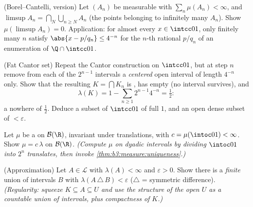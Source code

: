 \begin{exercise}[$\star\star$]\label{exo:b3:measure:4}
(Borel--Cantelli,  version) Let $(A_n)$ be measurable
with $\sum_n\mu(A_n) < \infty$, and $\limsup A_n =
\bigcap_N\bigcup_{n\geq N}A_n$ (the points belonging to
infinitely many $A_n$). Show $\mu(\limsup A_n) = 0$.
Application: for almost every $x \in \intcc01$, only finitely
many $n$ satisfy $\abs{x - p/q_n} \leq 4^{-n}$ for the
$n$-th rational $p/q_n$ of an enumeration of
$\Q\cap\intcc01$.
\end{exercise}

\begin{exercise}[$\star\star$]\label{exo:b3:measure:5}
(Fat Cantor set) Repeat the Cantor construction on $\intcc01$,
but at step $n$ remove from each of the $2^{n-1}$ intervals a
\emph{centered} open interval of length $4^{-n}$ only. Show
that the resulting $K = \bigcap K_n$ is , has empty
 (no interval survives), and
\[
\lambda(K) = 1 - \sum_{n\geq1}2^{n-1}4^{-n} = \tfrac12 :
\]
a nowhere  of  $\frac12$. Deduce a
\emph{} subset of $\intcc01$ of full  $1$, and an
open dense subset of  $< \varepsilon$.
\end{exercise}

\begin{exercise}[$\star\star$]\label{exo:b3:measure:6}
Let $\mu$ be a  on $\mathcal B(\R)$, invariant under
translations, with $c = \mu(\intoc01) < \infty$. Show $\mu =
c\,\lambda$ on $\mathcal B(\R)$. \emph{(Compute $\mu$ on dyadic intervals by dividing
$\intoc01$ into $2^n$ translates, then invoke
\cref{thm:b3:measure:uniqueness}.)}
\end{exercise}

\begin{exercise}[$\star\star$]\label{exo:b3:measure:7}
(Approximation) Let $A \in \mathcal L$ with $\lambda(A) <
\infty$ and $\varepsilon > 0$. Show there is a \emph{finite}
union of intervals $B$ with $\lambda(A\,\triangle\,B) <
\varepsilon$ ($\triangle$ = symmetric difference).
\emph{(Regularity: squeeze $K \subseteq A \subseteq U$ and use
the structure of the open $U$ as a countable union of
intervals, plus compactness of $K$.)}
\end{exercise}

